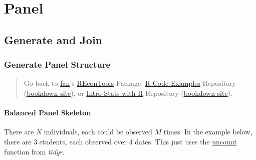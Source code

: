 \documentclass[
]{book}
\begin{document}
\hypertarget{panel}{%
\chapter{Panel}\label{panel}}

\hypertarget{generate-and-join}{%
\section{Generate and Join}\label{generate-and-join}}

\hypertarget{generate-panel-structure}{%
\subsection{Generate Panel Structure}\label{generate-panel-structure}}

\begin{quote}
Go back to \href{http://fanwangecon.github.io/}{fan}'s \href{https://fanwangecon.github.io/REconTools/}{REconTools} Package, \href{https://fanwangecon.github.io/R4Econ/}{R Code Examples} Repository (\href{https://fanwangecon.github.io/R4Econ/bookdown}{bookdown site}), or \href{https://fanwangecon.github.io/Stat4Econ/}{Intro Stats with R} Repository (\href{https://fanwangecon.github.io/Stat4Econ/bookdown}{bookdown site}).
\end{quote}

\hypertarget{balanced-panel-skeleton}{%
\subsubsection{Balanced Panel Skeleton}\label{balanced-panel-skeleton}}

There are \(N\) individuals, each could be observed \(M\) times. In the example below, there are 3 students, each observed over 4 dates. This just uses the \href{https://tidyr.tidyverse.org/reference/uncount.html}{uncount} function from \emph{tidyr}.
\end{document}
